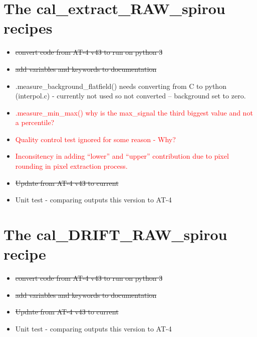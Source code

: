 \section{The cal\_extract\_RAW\_spirou recipes}
\label{ch:todo:cal_extract_RAW_spirou}

\begin{itemize}
	\item \sout{convert code from AT-4 v43 to run on python 3}
	\item \sout{add variables and keywords to documentation}
	\item \spirouBACK.measure\_background\_flatfield() needs converting from C to python (interpol.c) - currently not used so not converted -- background set to zero.
	\item \textcolor{red}{\spirouBACK.measure\_min\_max() why is the max\_signal the third biggest value and not a percentile?}
	\item \textcolor{red}{Quality control test  ignored for some reason - Why?}
	\item \textcolor{red}{Inconsitency in adding ``lower'' and ``upper'' contribution due to pixel rounding in pixel extraction process.}
	\item \sout{Update from AT-4 v43 to current}
	\item Unit test - comparing outputs this version to AT-4
\end{itemize}

\section{The cal\_DRIFT\_RAW\_spirou recipe}
\label{ch:todo:cal_DRIFT_RAW_spirou}

\begin{itemize}
	\item \sout{convert code from AT-4 v43 to run on python 3}
	\item \sout{add variables and keywords to documentation}
	\item \sout{Update from AT-4 v43 to current}
	\item Unit test - comparing outputs this version to AT-4
\end{itemize}


